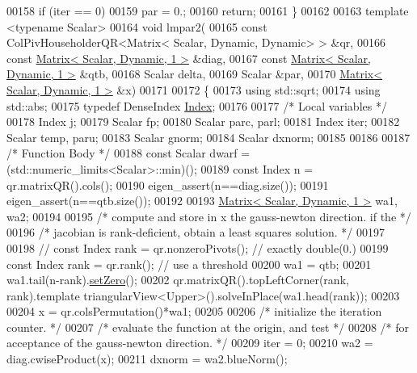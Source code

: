 \begin{DoxyCode}
00158     \textcolor{keywordflow}{if} (iter == 0)
00159         par = 0.;
00160     \textcolor{keywordflow}{return};
00161 \}
00162 
00163 \textcolor{keyword}{template} <\textcolor{keyword}{typename} Scalar>
00164 \textcolor{keywordtype}{void} lmpar2(
00165         \textcolor{keyword}{const} ColPivHouseholderQR<Matrix< Scalar, Dynamic, Dynamic> > &qr,
00166         \textcolor{keyword}{const} \hyperlink{group___core___module}{Matrix< Scalar, Dynamic, 1 >}  &diag,
00167         \textcolor{keyword}{const} \hyperlink{group___core___module}{Matrix< Scalar, Dynamic, 1 >}  &qtb,
00168         Scalar delta,
00169         Scalar &par,
00170         \hyperlink{group___core___module}{Matrix< Scalar, Dynamic, 1 >}  &x)
00171 
00172 \{
00173     \textcolor{keyword}{using} std::sqrt;
00174     \textcolor{keyword}{using} std::abs;
00175     \textcolor{keyword}{typedef} DenseIndex \hyperlink{namespace_eigen_a62e77e0933482dafde8fe197d9a2cfde}{Index};
00176 
00177     \textcolor{comment}{/* Local variables */}
00178     Index j;
00179     Scalar fp;
00180     Scalar parc, parl;
00181     Index iter;
00182     Scalar temp, paru;
00183     Scalar gnorm;
00184     Scalar dxnorm;
00185 
00186 
00187     \textcolor{comment}{/* Function Body */}
00188     \textcolor{keyword}{const} Scalar dwarf = (std::numeric\_limits<Scalar>::min)();
00189     \textcolor{keyword}{const} Index n = qr.matrixQR().cols();
00190     eigen\_assert(n==diag.size());
00191     eigen\_assert(n==qtb.size());
00192 
00193     \hyperlink{group___core___module}{Matrix< Scalar, Dynamic, 1 >}  wa1, wa2;
00194 
00195     \textcolor{comment}{/* compute and store in x the gauss-newton direction. if the */}
00196     \textcolor{comment}{/* jacobian is rank-deficient, obtain a least squares solution. */}
00197 
00198 \textcolor{comment}{//    const Index rank = qr.nonzeroPivots(); // exactly double(0.)}
00199     \textcolor{keyword}{const} Index rank = qr.rank(); \textcolor{comment}{// use a threshold}
00200     wa1 = qtb;
00201     wa1.tail(n-rank).\hyperlink{class_eigen_1_1_plain_object_base_ac21ad5f989f320e46958b75ac8d9a1da}{setZero}();
00202     qr.matrixQR().topLeftCorner(rank, rank).template triangularView<Upper>().solveInPlace(wa1.head(rank));
00203 
00204     x = qr.colsPermutation()*wa1;
00205 
00206     \textcolor{comment}{/* initialize the iteration counter. */}
00207     \textcolor{comment}{/* evaluate the function at the origin, and test */}
00208     \textcolor{comment}{/* for acceptance of the gauss-newton direction. */}
00209     iter = 0;
00210     wa2 = diag.cwiseProduct(x);
00211     dxnorm = wa2.blueNorm();

\end{DoxyCode}
